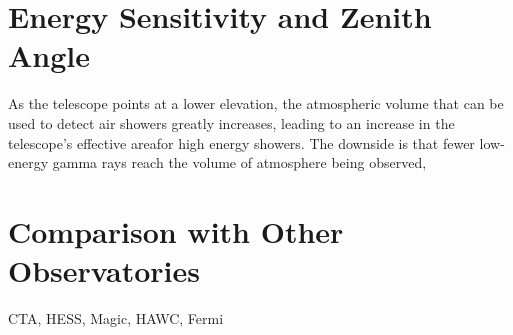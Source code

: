\section{Energy Sensitivity and Zenith Angle}

As the telescope points at a lower elevation, the atmospheric volume that can be used to detect air showers greatly increases, leading to an increase in the telescope's effective areafor high energy showers.
The downside is that fewer low-energy gamma rays reach the volume of atmosphere being observed, 

\section{Comparison with Other Observatories}


CTA, HESS, Magic, HAWC, Fermi
